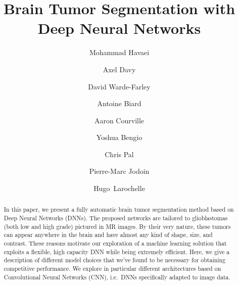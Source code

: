 \documentclass[final,5p,times,twocolumn]{elsarticle}
\begin{document}
\begin{frontmatter}



\title{Brain Tumor Segmentation with Deep Neural Networks}











\author[uds]{Mohammad Havaei}

\author[ens]{Axel Davy} 

\author[udm]{David Warde-Farley} 

\author[udm,polyp]{Antoine Biard}   

\author[udm]{Aaron Courville}

\author[udm]{Yoshua Bengio}

\author[udm,poly]{Chris Pal}

\author[uds]{Pierre-Marc Jodoin}

\author[uds,twitter]{Hugo~Larochelle}



\address[uds]{Universit\'e de Sherbrooke, Sherbrooke, Qc, Canada}

\address[ens]{\'Ecole Normale sup\'erieure, Paris, France}

\address[udm]{Universit\'e de Montr\'eal, Montr\'eal, Canada}

\address[polyp]{\'Ecole polytechnique, Palaiseau, France}

\address[poly]{\'Ecole Polytechnique de Montr\'eal , Canada}
\address[twitter]{Twitter, USA}





\begin{abstract}

  In this paper, we present a fully automatic brain tumor segmentation method based on Deep Neural Networks (DNNs).  The proposed networks are tailored to glioblastomas (both low and high grade) pictured in MR images.  By their very nature, these tumors can appear anywhere in the brain and have almost any kind of shape, size, and contrast. These reasons motivate our exploration of a machine learning solution that exploits a flexible, high capacity DNN while being extremely efficient. Here, we give a description of different model choices that we've found to be necessary for obtaining competitive performance. We explore in particular different architectures based on Convolutional Neural Networks (CNN), i.e.\ DNNs specifically adapted to image data. 
  

\end{abstract}
\end{frontmatter}
\end{document}
